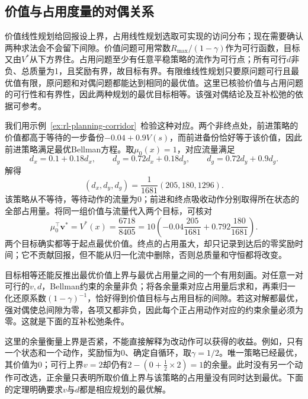 \subsection{价值与占用度量的对偶关系}
\label{sec:rl-planning-duality}

价值线性规划给回报设上界，占用线性规划选取可实现的访问分布；现在需要确认两种求法会不会留下间隙。价值问题可用常数$R_{\max}/(1-\gamma)$作为可行函数，目标又由$V^*$从下方界住。占用问题至少有任意平稳策略的流作为可行点；所有可行$d$非负、总质量为1，且奖励有界，故目标有界。有限维线性规划只要原问题可行且最优值有限，原问题和对偶问题都能达到相同的最优值。这里已核验价值与占用问题的可行性和有界性，因此两种规划的最优目标相等。该强对偶结论及互补松弛的依据可参考。

我们用示例~\ref{ex:rl-planning-corridor}~检验这种对应。两个非终点处，前进策略的价值都高于等待的一步备份$-0.04+0.9V(s)$，而前进备份恰好等于该价值，因此前进策略满足最优Bellman方程。取$\mu_0(x)=1$，对应流量满足
\[
 d_x=0.1+0.18d_x,\qquad
 d_y=0.72d_x+0.18d_y,\qquad
 d_g=0.72d_y+0.9d_g.
\]
解得
\[
 (d_x,d_y,d_g)=\frac{1}{1681}(205,180,1296).
\]
该策略从不等待，等待动作的流量为0；前进和终点吸收动作分别取得所在状态的全部占用量。将同一组价值与流量代入两个目标，可核对
\[
 \mu_0^\top\bm v^*=V^*(x)=\frac{6718}{8405}
 =10\left(-0.04\frac{205}{1681}
           +0.792\frac{180}{1681}\right).
\]
两个目标确实都等于起点最优价值。终点的占用虽大，却只记录到达后的零奖励时间；它不贡献回报，但不能从归一化流中删除，否则总质量和守恒都将改变。

目标相等还能反推出最优价值上界与最优占用量之间的一个有用刻画。对任意一对可行的$v,d$，Bellman约束的余量非负；将各余量乘对应占用量后求和，再乘归一化还原系数$(1-\gamma)^{-1}$，恰好得到价值目标与占用目标的间隙。若这对解都最优，强对偶使总间隙为零，各项又都非负，因此每个正占用动作对应的约束余量必须为零。这就是下面的互补松弛条件。

这里的余量衡量上界是否紧，不能直接解释为改动作可以获得的收益。例如，只有一个状态和一个动作，奖励恒为0、确定自循环，取$\gamma=1/2$。唯一策略已经最优，其价值为0；可行上界$v=2$却仍有$2-(0+\tfrac12\times2)=1$的余量。此时没有另一个动作可改选，正余量只表明所取价值上界与该策略的占用量没有同时达到最优。下面的定理明确要求$v$与$d$都是相应规划的最优解。

